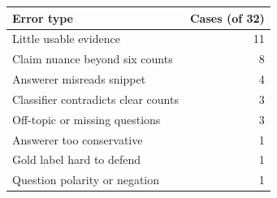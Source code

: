 \begin{tabular}{@{}lr@{}}
\toprule
Error type & Cases (of 32) \\
\midrule
Little usable evidence & 11 \\
Claim nuance beyond six counts & 8 \\
Answerer misreads snippet & 4 \\
Classifier contradicts clear counts & 3 \\
Off-topic or missing questions & 3 \\
Answerer too conservative & 1 \\
Gold label hard to defend & 1 \\
Question polarity or negation & 1 \\
\bottomrule
\end{tabular}
